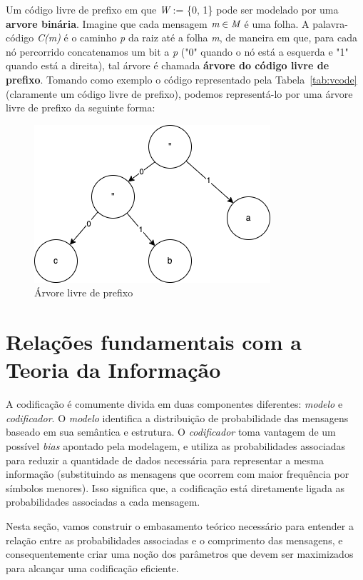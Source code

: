 Um código livre de prefixo em que \emph{W} := \{0, 1\} pode ser modelado por uma \textbf{arvore binária}. 
Imagine que cada mensagem $\emph{m} \in \emph{M}$ é uma folha. A palavra-código \emph{C(m)} é o caminho \emph{p} da raiz até a folha \emph{m}, de maneira em que, para cada nó percorrido concatenamos um bit a \emph{p} ("0" quando o nó está a esquerda e "1" quando está a direita), tal árvore é chamada \textbf{árvore do código livre de prefixo}. Tomando como exemplo o código representado pela Tabela~\ref{tab:vcode} (claramente um código livre de prefixo), podemos representá-lo por uma árvore livre de prefixo da seguinte forma:

\begin{figure}[h]
   \centering
   \includegraphics[scale=0.75]{figs/prefixtree.png}
    \caption{Árvore livre de prefixo}
    \label{fig:prefixt}
 \end{figure}
\section{Relações fundamentais com a Teoria da Informação}
A codificação é comumente divida em duas componentes diferentes: \emph{modelo} e \emph{codificador}. 
O \emph{modelo} identifica a distribuição de probabilidade das mensagens baseado em sua semântica e estrutura. 
O \emph{codificador} toma vantagem de um possível \emph{bias} apontado pela modelagem, e utiliza as probabilidades associadas para reduzir a quantidade de dados necessária para representar a mesma informação (substituindo as mensagens que ocorrem com maior frequência por símbolos menores).
Isso significa que, a codificação está diretamente ligada as probabilidades associadas a cada mensagem.

Nesta seção, vamos construir o embasamento teórico necessário para entender a relação entre as probabilidades associadas e o comprimento das mensagens, e consequentemente criar uma noção dos parâmetros que devem ser maximizados para alcançar uma codificação eficiente.

